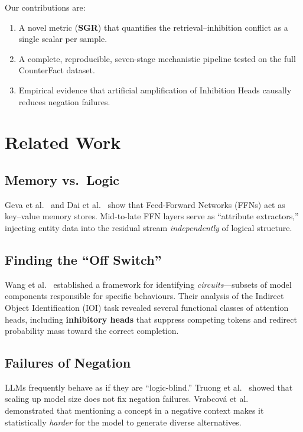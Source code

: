 \documentclass[11pt]{article}
\begin{document}
Our contributions are:
\begin{enumerate}
\item A novel metric (\textbf{SGR}) that quantifies the retrieval--inhibition
      conflict as a single scalar per sample.
\item A complete, reproducible, seven-stage mechanistic pipeline tested on
      the full CounterFact dataset.
\item Empirical evidence that artificial amplification of Inhibition Heads
      causally reduces negation failures.
\end{enumerate}

\section{Related Work}

\subsection{Memory vs.\ Logic}
Geva et al.\  and Dai et al.\ 
show that Feed-Forward Networks (FFNs) act as key--value memory stores.
Mid-to-late FFN layers serve as ``attribute extractors,'' injecting entity
data into the residual stream \emph{independently} of logical structure.

\subsection{Finding the ``Off Switch''}
Wang et al.\ 
established a framework for identifying \emph{circuits}—subsets of model
components responsible for specific behaviours. Their analysis of the
Indirect Object Identification (IOI) task revealed several functional
classes of attention heads, including \textbf{inhibitory heads} that
suppress competing tokens and redirect probability mass toward the
correct completion.

\subsection{Failures of Negation}
LLMs frequently behave as if they are ``logic-blind.''
Truong et al.\  showed that scaling up model size
does not fix negation failures.  Vrabcov\'{a} et al.\ 
demonstrated that mentioning a concept in a negative context makes it
statistically \emph{harder} for the model to generate diverse alternatives.
\end{document}
